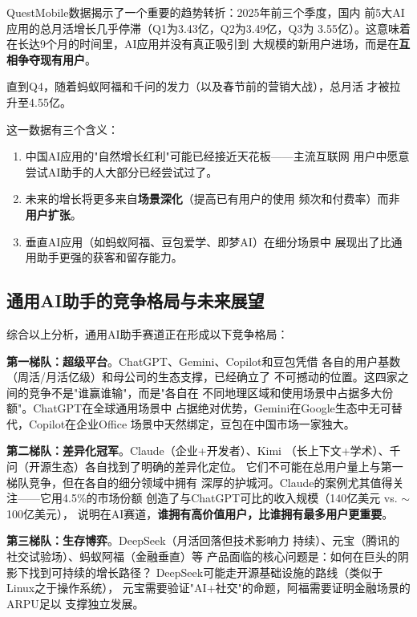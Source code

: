 \begin{whybox}
QuestMobile数据揭示了一个重要的趋势转折：2025年前三个季度，国内
前5大AI应用的总月活增长几乎停滞（Q1为3.43亿，Q2为3.49亿，Q3为
3.55亿）。这意味着在长达9个月的时间里，AI应用并没有真正吸引到
大规模的新用户进场，而是在\textbf{互相争夺现有用户}。

直到Q4，随着蚂蚁阿福和千问的发力（以及春节前的营销大战），总月活
才被拉升至4.55亿。

这一数据有三个含义：
\begin{enumerate}
  \item 中国AI应用的"自然增长红利"可能已经接近天花板——主流互联网
    用户中愿意尝试AI助手的人大部分已经尝试过了。
  \item 未来的增长将更多来自\textbf{场景深化}（提高已有用户的使用
    频次和付费率）而非\textbf{用户扩张}。
  \item 垂直AI应用（如蚂蚁阿福、豆包爱学、即梦AI）在细分场景中
    展现出了比通用助手更强的获客和留存能力。
\end{enumerate}
\end{whybox}

\subsection{通用AI助手的竞争格局与未来展望}
\label{subsec:assistants-landscape}

综合以上分析，通用AI助手赛道正在形成以下竞争格局：

\textbf{第一梯队：超级平台}。ChatGPT、Gemini、Copilot和豆包凭借
各自的用户基数（周活/月活亿级）和母公司的生态支撑，已经确立了
不可撼动的位置。这四家之间的竞争不是"谁赢谁输"，而是"各自在
不同地理区域和使用场景中占据多大份额"。ChatGPT在全球通用场景中
占据绝对优势，Gemini在Google生态中无可替代，Copilot在企业Office
场景中天然绑定，豆包在中国市场一家独大。

\textbf{第二梯队：差异化冠军}。Claude（企业+开发者）、Kimi
（长上下文+学术）、千问（开源生态）各自找到了明确的差异化定位。
它们不可能在总用户量上与第一梯队竞争，但在各自的细分领域中拥有
深厚的护城河。Claude的案例尤其值得关注——它用4.5\%的市场份额
创造了与ChatGPT可比的收入规模（140亿美元 vs. $\sim$100亿美元），
说明在AI赛道，\textbf{谁拥有高价值用户，比谁拥有最多用户更重要}。

\textbf{第三梯队：生存博弈}。DeepSeek（月活回落但技术影响力
持续）、元宝（腾讯的社交试验场）、蚂蚁阿福（金融垂直）等
产品面临的核心问题是：如何在巨头的阴影下找到可持续的增长路径？
DeepSeek可能走开源基础设施的路线（类似于Linux之于操作系统），
元宝需要验证"AI+社交"的命题，阿福需要证明金融场景的ARPU足以
支撑独立发展。

